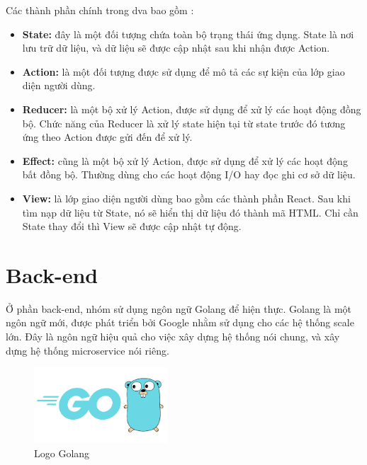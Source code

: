     Các thành phần chính trong dva bao gồm \cite{technologyDvaAdvance}:
    \begin{itemize}
        \item \textbf{State:} đây là một đối tượng chứa toàn bộ trạng thái ứng dụng. State là nơi lưu trữ dữ liệu, và dữ liệu sẽ được cập nhật sau khi nhận được Action.
        \item \textbf{Action:} là một đối tượng được sử dụng để mô tả các sự kiện của lớp giao diện người dùng.
        \item \textbf{Reducer:} là một bộ xử lý Action, được sử dụng để xử lý các hoạt động đồng bộ. Chức năng của Reducer là xử lý state hiện tại từ state trước đó tương ứng theo Action được gửi đến để xử lý.
        \item \textbf{Effect:} cũng là một bộ xử lý Action, được sử dụng để xử lý các hoạt động bất đồng bộ. Thường dùng cho các hoạt động I/O hay đọc ghi cơ sở dữ liệu.
        \item \textbf{View:} là lớp giao diện người dùng bao gồm các thành phần React. Sau khi tìm nạp dữ liệu từ State, nó sẽ hiển thị dữ liệu đó thành mã HTML. Chỉ cần State thay đổi thì View sẽ được cập nhật tự động.
    \end{itemize}

    
    
\section{Back-end}
\hspace{0.5cm}Ở phần back-end, nhóm sử dụng ngôn ngữ Golang để hiện thực. Golang là một ngôn ngữ mới, được phát triển bởi Google nhằm sử dụng cho các hệ thống scale lớn. Đây là ngôn ngữ hiệu quả cho việc xây dựng hệ thống nói chung, và xây dựng hệ thống microservice nói riêng.

\begin{figure}[!htp]
    \begin{center}
    \includegraphics[width=5cm]{img/Technology/Golang.png}
    \end{center}
    \caption{Logo Golang \cite{technologyGolang}}
\end{figure}

